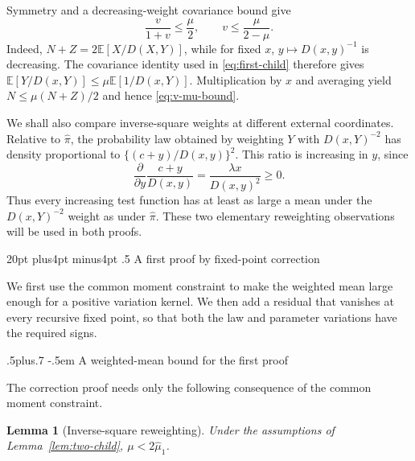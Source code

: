 \documentclass[11pt,reqno]{amsart}
\makeatletter
\def\section{\@startsection{section}{1}{0pt}%
  {20pt plus4pt minus4pt}
  {.5\linespacing}
  {\normalfont\bfseries}}
\def\subsection{\@startsection{subsection}{2}{0pt}%
  {.5\linespacing plus.7\linespacing}
  {-.5em}
  {\normalfont\scshape}}
\theoremstyle{plain}
\newtheorem{lemma}[theorem]{Lemma}
\theoremstyle{definition}
\theoremstyle{remark}
\numberwithin{equation}{section}
\newcommand{\E}{\mathbb E}
\makeatother
\begin{document}
Symmetry and a decreasing-weight covariance bound give
\begin{equation}\label{eq:v-mu-bound}
 \frac{v}{1+v}\le\frac\mu2,
 \qquad v\le\frac{\mu}{2-\mu}.
\end{equation}
Indeed, $N+Z=2\E[X/D(X,Y)]$, while for fixed $x$,
$y\mapsto D(x,y)^{-1}$ is decreasing. The covariance identity used in
\eqref{eq:first-child} therefore gives
$\E[Y/D(x,Y)]\le\mu\E[1/D(x,Y)]$. Multiplication by $x$ and averaging
yield $N\le\mu(N+Z)/2$ and hence \eqref{eq:v-mu-bound}.

We shall also compare inverse-square weights at different external
coordinates. Relative to $\widehat\pi$, the probability law obtained
by weighting $Y$ with $D(x,Y)^{-2}$ has density proportional to
$\{(c+y)/D(x,y)\}^2$. This ratio is increasing in $y$, since
\begin{equation}\label{eq:ratio-derivative}
 \frac{\partial}{\partial y}\frac{c+y}{D(x,y)}
 =\frac{\lambda x}{D(x,y)^2}\ge0.
\end{equation}
Thus every increasing test function has at least as large a mean under
the $D(x,Y)^{-2}$ weight as under $\widehat\pi$. These two elementary
reweighting observations will be used in both proofs.

\section{A first proof by fixed-point correction}\label{sec:correction}

We first use the common moment constraint to make the weighted mean
large enough for a positive variation kernel. We then add a residual
that vanishes at every recursive fixed point, so that both the law and
parameter variations have the required signs.

\subsection{A weighted-mean bound for the first proof}

The correction proof needs only the following consequence of the
common moment constraint.

\begin{lemma}[Inverse-square reweighting]\label{lem:tilt}
Under the assumptions of Lemma~\ref{lem:two-child},
$\mu<2\widehat\mu_1$.
\end{lemma}
\end{document}
